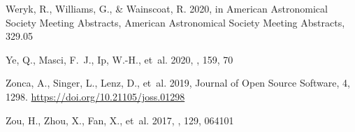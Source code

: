 \documentclass[twocolumn]{aastex62}
\begin{document}
\begin{thebibliography}{}
{Weryk}, R., {Williams}, G., \& {Wainscoat}, R. 2020, in American Astronomical
  Society Meeting Abstracts, American Astronomical Society Meeting Abstracts,
  329.05

{Ye}, Q., {Masci}, F.~J., {Ip}, W.-H., {et~al.} 2020, \aj, 159, 70

Zonca, A., Singer, L., Lenz, D., {et~al.} 2019, Journal of Open Source
  Software, 4, 1298.
\newblock \url{https://doi.org/10.21105/joss.01298}

{Zou}, H., {Zhou}, X., {Fan}, X., {et~al.} 2017, \pasp, 129, 064101

\end{thebibliography}


\end{document}
